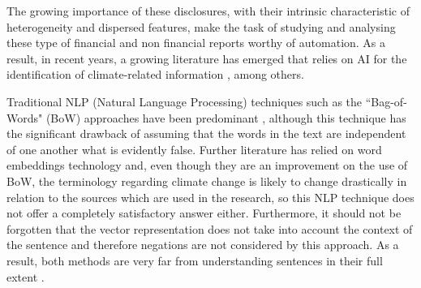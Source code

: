 \documentclass[runningheads]{llncs}
\begin{document}
The growing importance of these disclosures, with their intrinsic characteristic of heterogeneity and dispersed features, make the task of studying and analysing these type of financial and non financial reports worthy of automation. As a result, in recent years, a growing literature has emerged that relies on AI for the identification of climate-related information \cite{sautner2020firm,meddeb2022counteracting,kolbel2020ask,bingler2022cheap,sietsma2022global,webersinke2021climatebert,friederich2021automated,hsu2021diverse,luccioni2019using,luccioni2020analyzing,biesbroek2020machine,alashri2016climate}, among others.  

Traditional NLP (Natural Language Processing) techniques such as the “Bag-of-Words" (BoW) approaches have been predominant \cite{donner2016measuring,loughran2016textual,cody2015climate,sham2022climate}, although this technique has the significant  drawback of assuming that the words in the text are independent of one another what is evidently false. Further literature has relied on word embeddings technology \cite{luccioni2019using} and, even though they are an improvement on the use of BoW, the terminology regarding climate change is likely to change drastically in relation to the sources which are used in the research, so this NLP technique does not offer a completely satisfactory answer either. Furthermore, it should not be forgotten that the vector representation does not take into account the context of the sentence and therefore negations are not considered by this approach. As a result, both methods are very far from understanding sentences in their full extent \cite{kolbel2022ask}.  
\end{document}
